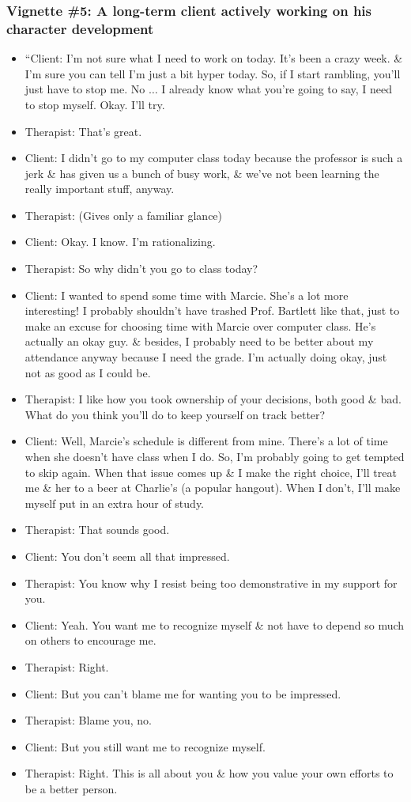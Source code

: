 \documentclass{article}
\numberwithin{equation}{section}
\begin{document}
\subsubsection{Vignette \#5: A long-term client actively working on his character development}

\begin{itemize}
	\item ``Client: I'm not sure what I need to work on today. It's been a crazy week. \& I'm sure you can tell I'm just a bit hyper today. So, if I start rambling, you'll just have to stop me. No $\ldots$ I already know what you're going to say, I need to stop myself. Okay. I'll try.
	\item Therapist: That's great.
	\item Client: I didn't go to my computer class today because the professor is such a jerk \& has given us a bunch of busy work, \& we've not been learning the really important stuff, anyway.
	\item Therapist: (Gives only a familiar glance)
	\item Client: Okay. I know. I'm rationalizing.
	\item Therapist: So why didn't you go to class today?
	\item Client: I wanted to spend some time with Marcie. She's a lot more interesting! I probably shouldn't have trashed Prof. Bartlett like that, just to make an excuse for choosing time with Marcie over computer class. He's actually an okay guy. \& besides, I probably need to be better about my attendance anyway because I need the grade. I'm actually doing okay, just not as good as I could be.
	\item Therapist: I like how you took ownership of your decisions, both good \& bad. What do you think you'll do to keep yourself on track better?
	\item Client: Well, Marcie's schedule is different from mine. There's a lot of time when she doesn't have class when I do. So, I'm probably going to get tempted to skip again. When that issue comes up \& I make the right choice, I'll treat me \& her to a beer at Charlie's (a popular hangout). When I don't, I'll make myself put in an extra hour of study.
	\item Therapist: That sounds good.
	\item Client: You don't seem all that impressed.
	\item Therapist: You know why I resist being too demonstrative in my support for you.
	\item Client: Yeah. You want me to recognize myself \& not have to depend so much on others to encourage me.
	\item Therapist: Right.
	\item Client: But you can't blame me for wanting you to be impressed.
	\item Therapist: Blame you, no.
	\item Client: But you still want me to recognize myself.
	\item Therapist: Right. This is all about you \& how you value your own efforts to be a better person.
\end{itemize}
\end{document}
